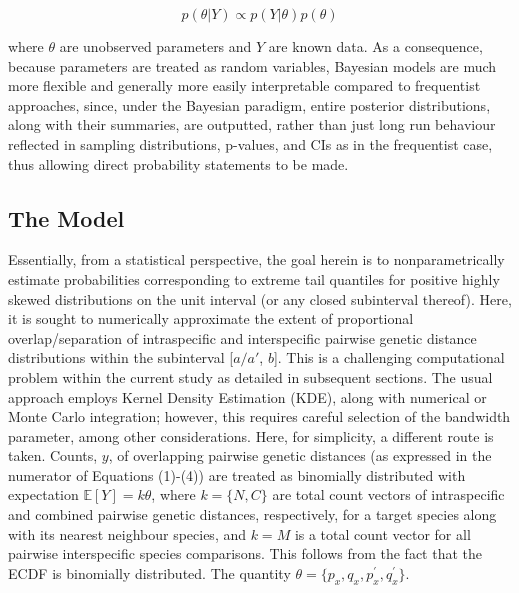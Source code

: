 \documentclass[12pt]{article}
\begin{document}
\begin{equation}
p(\theta | Y) \propto p(Y | \theta)p(\theta)
\end{equation}


\noindent where $\theta$ are unobserved parameters and $Y$ are known data.  As a consequence, because parameters are treated as random variables, Bayesian models are much more flexible and generally more easily interpretable compared to frequentist approaches, since, under the Bayesian paradigm, entire posterior distributions, along with their summaries, are outputted, rather than just long run behaviour reflected in sampling distributions, p-values, and CIs as in the frequentist case, thus allowing direct probability statements to be made. 

\subsection{The Model}

Essentially, from a statistical perspective, the goal herein is to nonparametrically estimate probabilities corresponding to extreme tail quantiles for positive highly skewed distributions on the unit interval  (or any closed subinterval thereof). Here, it is sought to numerically approximate the extent of proportional overlap/separation of intraspecific and interspecific pairwise genetic distance distributions within the subinterval [$a/a'$, $b$]. This is a challenging computational problem within the current study as detailed in subsequent sections. The usual approach employs Kernel Density Estimation (KDE), along with numerical or Monte Carlo integration; however, this requires careful selection of the bandwidth parameter, among other considerations. Here, for simplicity, a different route is taken. Counts, $y$, of overlapping pairwise genetic distances (as expressed in the numerator of Equations (1)-(4)) are treated as binomially distributed with expectation $\mathbb{E}[Y] = k\theta$, where $k = \{N, C\}$ are total count vectors of intraspecific and combined pairwise genetic distances, respectively, for a target species along with its nearest neighbour species, and $k = M$ is a total count vector for all pairwise interspecific species comparisons. This follows from the fact that the ECDF is binomially distributed. The quantity $\theta = \{p_x, q_x, p^{'}_x, q^{'}_x\}$. 
\end{document}
